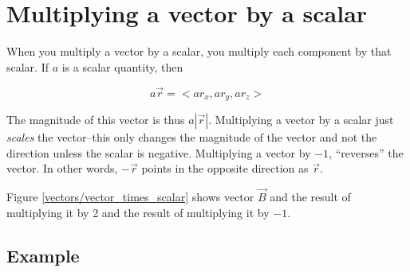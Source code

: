 \section*{Multiplying a vector by a scalar}

When you multiply a vector by a scalar, you multiply each component by that scalar. If $a$ is a scalar quantity, then

\begin{equation*}
	a\vec{r}= <ar_x, ar_y, ar_z>
\end{equation*}

The magnitude of this vector is thus $a|\vec{r}|$. Multiplying a vector by a scalar just \emph{scales} the vector--this only changes the magnitude of the vector and not the direction unless the scalar is negative. Multiplying a vector by $-1$, ``reverses'' the vector. In other words, $-\vec{r}$ points in the opposite direction as $\vec{r}$.

Figure \ref{vectors/vector_times_scalar} shows vector $\vec {B}$ and the result of multiplying it by 2 and the result of multiplying it by $-1$.


\subsection*{Example}



